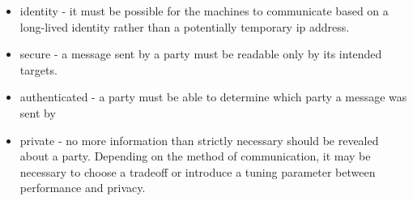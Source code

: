 \begin{itemize}
  \begin{itemize}
  \tightlist
  \item
    identity - it must be possible for the machines to communicate based
    on a long-lived identity rather than a potentially temporary
    \gls{ip} address.
  \item
    secure - a message sent by a party must be readable only by its
    intended targets.
  \item
    authenticated - a party must be able to determine which party a
    message was sent by
  \item
    private - no more information than strictly necessary should be
    revealed about a party. Depending on the method of communication, it
    may be necessary to choose a tradeoff or introduce a tuning
    parameter between performance and privacy.
  \end{itemize}
\end{itemize}
